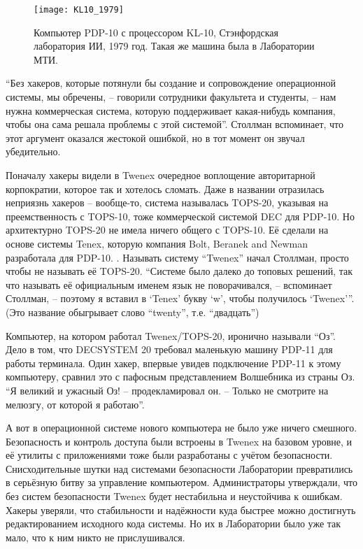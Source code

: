 \begin{figure}[ht] \centering
  \texttt{[image: KL10\_1979]}
  \caption{Компьютер PDP-10 с процессором KL-10, Стэнфордская лаборатория ИИ, 1979 год. Такая же машина была в Лаборатории МТИ.}
\end{figure}

\enquote{Без хакеров, которые потянули бы создание и сопровождение операционной системы, мы обречены, -- говорили сотрудники факультета и студенты, -- нам нужна коммерческая система, которую поддерживает какая-нибудь компания, чтобы она сама решала проблемы с этой системой}. Столлман вспоминает, что этот аргумент оказался жестокой ошибкой, но в тот момент он звучал убедительно.

Поначалу хакеры видели в Twenex очередное воплощение авторитарной корпократии, которое так и хотелось сломать. Даже в названии отразилась неприязнь хакеров -- вообще-то, система называлась TOPS-20, указывая на преемственность с TOPS-10, тоже коммерческой системой DEC для PDP-10. Но архитектурно TOPS-20 не имела ничего общего с TOPS-10. Её сделали на основе системы Tenex, которую компания Bolt, Beranek and Newman разработала для PDP-10. . Называть систему \enquote{Twenex} начал Столлман, просто чтобы не называть её TOPS-20. \enquote{Системе было далеко до топовых решений, так что называть её официальным именем язык не поворачивался, -- вспоминает Столлман, -- поэтому я вставил в \enquote{Tenex} букву \enquote{w}, чтобы получилось \enquote{Twenex}}. (Это название обыгрывает слово \enquote{twenty}, т.е. \enquote{двадцать})

Компьютер, на котором работал Twenex/TOPS-20, иронично называли \enquote{Оз}. Дело в том, что DECSYSTEM 20 требовал маленькую машину PDP-11 для работы терминала. Один хакер, впервые увидев подключение PDP-11 к этому компьютеру, сравнил это с пафосным представлением Волшебника из страны Оз. \enquote{Я великий и ужасный Оз! -- продекламировал он. -- Только не смотрите на мелюзгу, от которой я работаю}.

А вот в операционной системе нового компьютера не было уже ничего смешного. Безопасность и контроль доступа были встроены в Twenex на базовом уровне, и её утилиты с приложениями тоже были разработаны с учётом безопасности. Снисходительные шутки над системами безопасности Лаборатории превратились в серьёзную битву за управление компьютером. Администраторы утверждали, что без систем безопасности Twenex будет нестабильна и неустойчива к ошибкам. Хакеры уверяли, что стабильности и надёжности куда быстрее можно достигнуть редактированием исходного кода системы. Но их в Лаборатории было уже так мало, что к ним никто не прислушивался.

